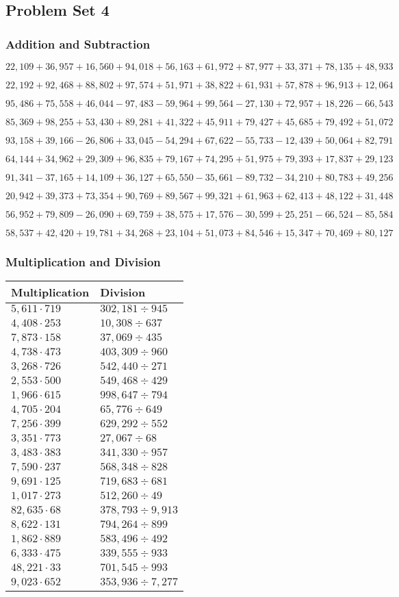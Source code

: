 \hypertarget{problem-set-4-4}{%
\subsection{Problem Set 4}\label{problem-set-4-4}}

\hypertarget{addition-and-subtraction-226}{%
\subsubsection{Addition and
Subtraction}\label{addition-and-subtraction-226}}

\(22,109+36,957+16,560+94,018+56,163+61,972+87,977+33,371+78,135+ 48,933\)

\(22,192+92,468+88,802+97,574+51,971+38,822+61,931+57,878+96,913+12,064\)

\(95,486+75,558+46,044-97,483-59,964+99,564-27,130+72,957+18,226-66,543\)

\(85,369+98,255+53,430+89,281+41,322+45,911+79,427+45,685+79,492+51,072\)

\(93,158+39,166-26,806+33,045-54,294+67,622-55,733-12,439+50,064+82,791\)

\(64,144+34,962+29,309+96,835+79,167+74,295+51,975+79,393+17,837+29,123\)

\(91,341-37,165+14,109+36,127+65,550-35,661-89,732-34,210+80,783+49,256\)

\(20,942+39,373+73,354+90,769+89,567+99,321+61,963+62,413+48,122+31,448\)

\(56,952+79,809-26,090+69,759+38,575+17,576-30,599+25,251-66,524-85,584\)

\(58,537+42,420+19,781+34,268+23,104+51,073+84,546+15,347+70,469+80,127\)

\hypertarget{multiplication-and-division-225}{%
\subsubsection{Multiplication and
Division}\label{multiplication-and-division-225}}

\begin{longtable}[]{@{}ll@{}}
\toprule
Multiplication & Division\tabularnewline
\midrule
\endhead
\(5,611\cdot719\) & \(302,181÷945\)\tabularnewline
\(4,408\cdot253\) & \(10,308÷637\)\tabularnewline
\(7,873\cdot158\) & \(37,069÷435\)\tabularnewline
\(4,738\cdot473\) & \(403,309÷960\)\tabularnewline
\(3,268\cdot726\) & \(542,440÷271\)\tabularnewline
\(2,553\cdot500\) & \(549,468÷429\)\tabularnewline
\(1,966\cdot615\) & \(998,647÷794\)\tabularnewline
\(4,705\cdot204\) & \(65,776÷649\)\tabularnewline
\(7,256\cdot399\) & \(629,292÷552\)\tabularnewline
\(3,351\cdot773\) & \(27,067÷68\)\tabularnewline
\(3,483\cdot383\) & \(341,330÷957\)\tabularnewline
\(7,590\cdot237\) & \(568,348÷828\)\tabularnewline
\(9,691\cdot125\) & \(719,683÷681\)\tabularnewline
\(1,017\cdot273\) & \(512,260÷49\)\tabularnewline
\(82,635\cdot68\) & \(378,793÷9,913\)\tabularnewline
\(8,622\cdot131\) & \(794,264÷899\)\tabularnewline
\(1,862\cdot889\) & \(583,496÷492\)\tabularnewline
\(6,333\cdot475\) & \(339,555÷933\)\tabularnewline
\(48,221\cdot33\) & \(701,545÷993\)\tabularnewline
\(9,023\cdot652\) & \(353,936÷7,277\)\tabularnewline
\bottomrule
\end{longtable}

